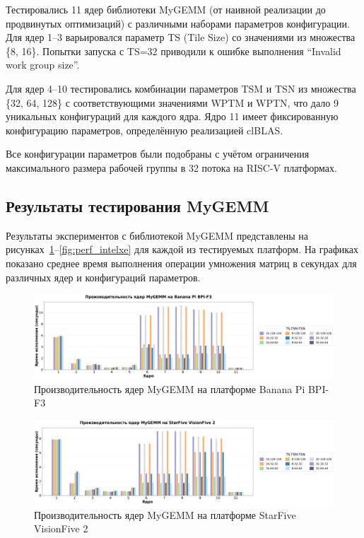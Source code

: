 Тестировались 11 ядер библиотеки MyGEMM (от наивной реализации до продвинутых оптимизаций) с различными наборами параметров конфигурации. Для ядер 1--3 варьировался параметр TS (Tile Size) со значениями из множества \{8, 16\}. Попытки запуска с TS=32 приводили к ошибке выполнения ``Invalid work group size''.

Для ядер 4--10 тестировались комбинации параметров TSM и TSN из множества \{32, 64, 128\} с соответствующими значениями WPTM и WPTN, что дало 9 уникальных конфигураций для каждого ядра. Ядро 11 имеет фиксированную конфигурацию параметров, определённую реализацией clBLAS.

Все конфигурации параметров были подобраны с учётом ограничения максимального размера рабочей группы в 32 потока на RISC-V платформах.

\subsection{Результаты тестирования MyGEMM}

Результаты экспериментов с библиотекой MyGEMM представлены на рисунках~\ref{fig:perf_bananapi}--\ref{fig:perf_intelxe} для каждой из тестируемых платформ. На графиках показано среднее время выполнения операции умножения матриц в секундах для различных ядер и конфигураций параметров.

\begin{figure}[H]
\centering
\includegraphics[width=1\textwidth]{figures/banana_pi.png}
\caption{Производительность ядер MyGEMM на платформе Banana Pi BPI-F3}
\label{fig:perf_bananapi}
\end{figure}

\begin{figure}[H]
\centering
\includegraphics[width=1\textwidth]{figures/starfive.png}
\caption{Производительность ядер MyGEMM на платформе StarFive VisionFive 2}
\label{fig:perf_starfive}
\end{figure}

